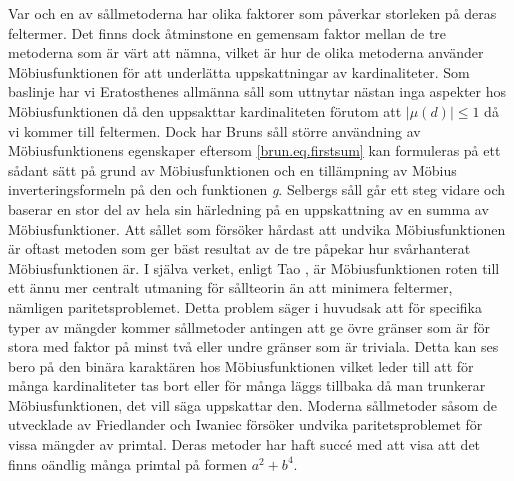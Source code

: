 Var och en av sållmetoderna har olika faktorer som påverkar storleken på deras feltermer.
Det finns dock åtminstone en gemensam faktor mellan de tre metoderna som är värt att nämna, vilket är hur de olika metoderna använder Möbiusfunktionen för att underlätta uppskattningar av kardinaliteter.
Som baslinje har vi Eratosthenes allmänna såll som uttnytar nästan inga aspekter hos Möbiusfunktionen då den uppsakttar kardinaliteten förutom att \(|\mu(d)| \leq 1\) då vi kommer till feltermen.
Dock har Bruns såll större användning av Möbiusfunktionens egenskaper eftersom \eqref{brun.eq.firstsum} kan formuleras på ett sådant sätt på grund av Möbiusfunktionen och en tillämpning av Möbius inverteringsformeln på den och funktionen \textit{g}.
Selbergs såll går ett steg vidare och baserar en stor del av hela sin härledning på en uppskattning av en summa av Möbiusfunktioner.
Att sållet som försöker hårdast att undvika Möbiusfunktionen är oftast metoden som ger bäst resultat av de tre påpekar hur svårhanterat Möbiusfunktionen är.
I själva verket, enligt Tao \cite{Tao}, är Möbiusfunktionen roten till ett ännu mer centralt utmaning för sållteorin än att minimera feltermer, nämligen paritetsproblemet.
Detta problem säger i huvudsak att för specifika typer av mängder kommer sållmetoder antingen att ge övre gränser som är för stora med faktor på minst två eller undre gränser som är triviala.
Detta kan ses bero på den binära karaktären hos Möbiusfunktionen vilket leder till att för många kardinaliteter tas bort eller för många läggs tillbaka då man trunkerar Möbiusfunktionen, det vill säga uppskattar den.
Moderna sållmetoder såsom de utvecklade av Friedlander och Iwaniec \cite{abPrimes} försöker undvika paritetsproblemet för vissa mängder av primtal.
Deras metoder har haft succé med att visa att det finns oändlig många primtal på formen \(a^2+b^4\).


